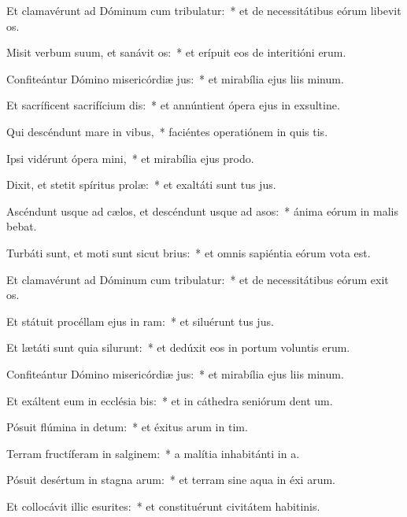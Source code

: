 \item Et clamavérunt ad Dóminum cum tribulatur:~* et de necessitátibus eórum libevit os.
\item Misit verbum suum, et sanávit os:~* et erípuit eos de interitióni erum.
\item Confiteántur Dómino misericórdiæ jus:~* et mirabília ejus liis minum.
\item Et sacríficent sacrifícium dis:~* et annúntient ópera ejus in exsultine.
\item Qui descéndunt mare in vibus,~* faciéntes operatiónem in quis tis.
\item Ipsi vidérunt ópera mini,~* et mirabília ejus  prodo.
\item Dixit, et stetit spíritus prolæ:~* et exaltáti sunt tus jus.
\item Ascéndunt usque ad cælos, et descéndunt usque ad asos:~* ánima eórum in malis bebat.
\item Turbáti sunt, et moti sunt sicut brius:~* et omnis sapiéntia eórum vota est.
\item Et clamavérunt ad Dóminum cum tribulatur:~* et de necessitátibus eórum exit os.
\item Et státuit procéllam ejus in ram:~* et siluérunt tus jus.
\item Et lætáti sunt quia silurunt:~* et dedúxit eos in portum voluntis erum.
\item Confiteántur Dómino misericórdiæ jus:~* et mirabília ejus liis minum.
\item Et exáltent eum in ecclésia bis:~* et in cáthedra seniórum dent um.
\item Pósuit flúmina in detum:~* et éxitus arum in tim.
\item Terram fructíferam in salginem:~* a malítia inhabitánti in a.
\item Pósuit desértum in stagna arum:~* et terram sine aqua in éxi arum.
\item Et collocávit illic esurites:~* et constituérunt civitátem habitinis.
